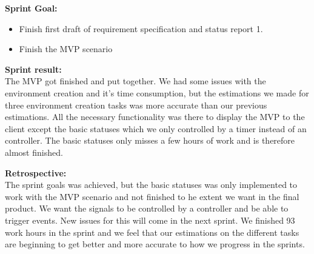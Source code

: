 \textbf{Sprint Goal:} \\
\begin{itemize}
    \item Finish first draft of requirement specification and status report 1.
    \item Finish the MVP scenario
\end{itemize}

\textbf{Sprint result:} \\
The MVP got finished and put together. We had some issues with the environment creation and it's time consumption, but the estimations we made for three environment creation tasks was more accurate than our previous estimations. All the necessary functionality was there to display the MVP to the client except the basic statuses which we only controlled by a timer instead of an controller. The basic statuses only misses a few hours of work and is therefore almost finished.

\textbf{Retrospective:} \\
The sprint goals was achieved, but the basic statuses was only implemented to work with the MVP scenario and not finished to he extent we want in the final product. We want the signals to be controlled by a controller and be able to trigger events. New issues for this will come in the next sprint. We finished 93 work hours in the sprint and we feel that our estimations on the different tasks are beginning to get better and more accurate to how we progress in the sprints.


